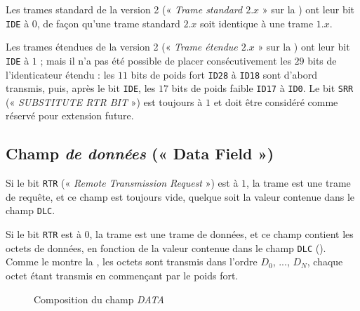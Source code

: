 Les trames standard de la version 2 (« \emph{Trame standard $2.x$} » sur la ) ont leur bit \texttt{IDE} à $0$, de façon qu'une trame standard $2.x$ soit identique à une trame $1.x$.

Les trames étendues de la version 2 (« \emph{Trame étendue $2.x$} » sur la ) ont leur bit \texttt{IDE} à $1$ ; mais il n'a pas été possible de placer consécutivement les $29$ bits de l'identicateur étendu : les $11$ bits de poids fort \texttt{ID28} à \texttt{ID18} sont d'abord transmis, puis, après le bit \texttt{IDE}, les $17$ bits de poids faible \texttt{ID17} à \texttt{ID0}. Le bit \texttt{SRR} (« \emph{SUBSTITUTE RTR BIT} ») est toujours à $1$  et doit être considéré comme réservé pour extension future.






\subsection{Champ \emph{de données} (« Data Field »)}

Si le bit \texttt{RTR} (« \emph{Remote Transmission Request} ») est à $1$, la trame est une trame de requête, et ce champ est toujours vide, quelque soit la valeur contenue dans le champ \texttt{DLC}.

Si le bit \texttt{RTR} est à $0$, la trame est une trame de données, et ce champ contient les octets de données, en fonction de la valeur contenue dans le champ \texttt{DLC} (). Comme le montre la , les octets sont transmis dans l'ordre \texttt{$D_0$}, ..., \texttt{$D_N$}, chaque octet étant transmis en commençant par le poids fort.



\begin{figure}[ht]
  \centering
  \caption{Composition du champ \emph{DATA}}
\end{figure}





